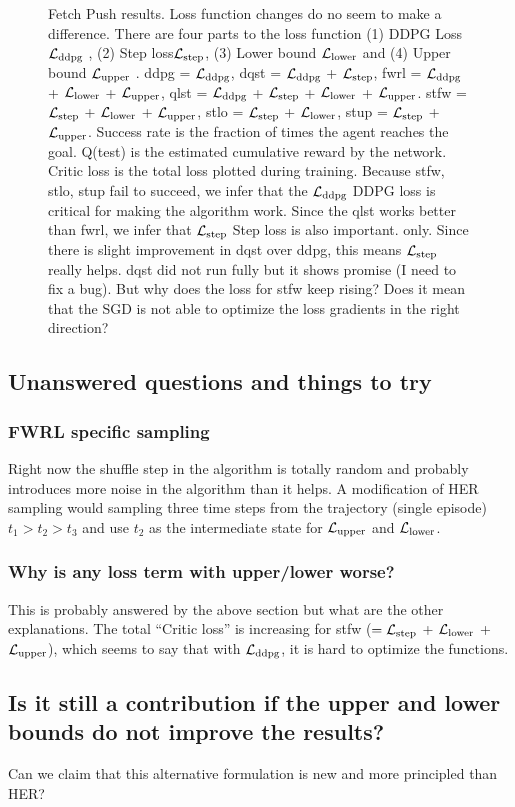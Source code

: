 \begin{figure}
  \caption{
    Fetch Push results. Loss function changes do no seem to make a difference.
    There are four parts to the loss function (1) DDPG Loss $\mathcal{L}_{\text{ddpg}}$ ,
    (2) Step loss$\mathcal{L}_{\text{step}}$,  
    (3) Lower bound $\mathcal{L}_{\text{lower}}$ and
    (4) Upper bound $\mathcal{L}_{\text{upper}}$ .
    ddpg = $\mathcal{L}_{\text{ddpg}}$,
    dqst = $\mathcal{L}_{\text{ddpg}}$ + $\mathcal{L}_{\text{step}}$,
    fwrl = $\mathcal{L}_{\text{ddpg}}$ + $\mathcal{L}_{\text{lower}}$ +
    $\mathcal{L}_{\text{upper}}$,
    qlst = $\mathcal{L}_{\text{ddpg}}$ + $\mathcal{L}_{\text{step}}$ + $\mathcal{L}_{\text{lower}}$ + $\mathcal{L}_{\text{upper}}$.
    stfw = $\mathcal{L}_{\text{step}}$ + $\mathcal{L}_{\text{lower}}$ + $\mathcal{L}_{\text{upper}}$,
    stlo = $\mathcal{L}_{\text{step}}$ + $\mathcal{L}_{\text{lower}}$,
    stup = $\mathcal{L}_{\text{step}}$ + $\mathcal{L}_{\text{upper}}$.
    Success rate is the fraction of times the agent reaches the goal. Q(test) is
    the estimated cumulative reward by the network. Critic loss is the total
    loss plotted during training.
    Because stfw, stlo, stup fail to succeed, we infer that the $\mathcal{L}_{\text{ddpg}}$ DDPG loss is
    critical for making the algorithm work. Since the qlst works better than
    fwrl, we infer that $\mathcal{L}_{\text{step}}$ Step loss is also important.
    only.
    Since there is slight improvement in dqst over ddpg, this means
    $\mathcal{L}_{\text{step}}$ really helps. dqst did not run fully but it shows
    promise (I need to fix a bug).
    But why does the loss for stfw keep rising? Does it mean that the SGD is not
    able to optimize the loss gradients in the right direction?
  }%
  \label{fig:fwrl-stepfwrl-noop-FetchPush}%
\end{figure}%
% 


\subsection{Unanswered questions and things to try}

\subsubsection{FWRL specific sampling}
Right now the shuffle step in the algorithm is totally random and probably
introduces more noise in the algorithm than it helps. A modification of HER
sampling would sampling three time steps from the trajectory (single episode)
$t_1 > t_2 > t_3$ and use $t_2$ as the intermediate state for
$\mathcal{L}_{\text{upper}}$ and $\mathcal{L}_{\text{lower}}$.


\subsubsection{Why is any loss term with upper/lower worse?}
This is probably answered by  the above section but what are the other
explanations. The total ``Critic loss'' is increasing for stfw
($=\mathcal{L}_{\text{step}}$ + $\mathcal{L}_{\text{lower}}$ + $\mathcal{L}_{\text{upper}}$),
which seems to say that with $\mathcal{L}_{\text{ddpg}}$, it is hard to optimize the functions.


\subsection{Is it still a contribution if the upper and lower bounds do not
  improve the results?}
Can we claim that this alternative formulation is new and more principled than HER?

